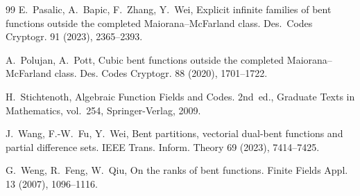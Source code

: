 \documentclass[12pt]{article}
\theoremstyle{plain}
\theoremstyle{definition}
\begin{document}
\begin{thebibliography}{99}
		E.~Pasalic, A.~Bapic, F.~Zhang, Y.~Wei,
		Explicit infinite families of bent functions outside the completed
		Maiorana--McFarland class.
		Des.\ Codes Cryptogr. 91 (2023), 2365--2393.
		
		 A.~Polujan, A.~Pott, Cubic bent functions outside the completed Maiorana--McFarland class. Des. Codes Cryptogr. 88 (2020), 1701--1722.
		
		H.~Stichtenoth, Algebraic Function Fields and Codes.
		2nd~ed.,
		Graduate Texts in Mathematics, vol.~254,
		Springer-Verlag, 2009.
		
		 J.~Wang, F.-W.~Fu, Y.~Wei, Bent partitions, vectorial dual-bent functions and partial difference sets. IEEE Trans. Inform. Theory 69 (2023), 7414--7425.
		
		  G.~Weng, R.~Feng, W.~Qiu, On the ranks of bent functions.
		Finite Fields Appl. 13 (2007), 1096--1116.
	
	\end{thebibliography}
	
	
	
\end{document}
